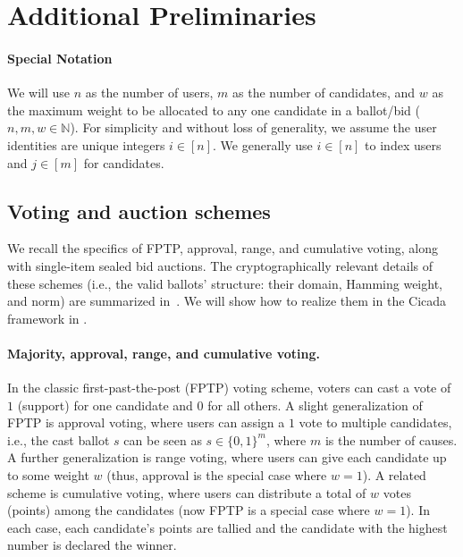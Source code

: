 \section{Additional Preliminaries}

\paragraph{Special Notation} We will use $n$ as the number of users, $m$ as the number of candidates, and $w$ as the maximum weight to be allocated to any one candidate in a ballot/bid ($n,m,w \in \mathbb{N}$). For simplicity and without loss of generality, we assume the user identities are unique integers $i \in [n]$.
We generally use $i \in [n]$ to index users and $j \in [m]$ for candidates.

\subsection{Voting and auction schemes}

We recall the specifics of FPTP, approval, range, and cumulative voting, along with single-item sealed bid auctions. The cryptographically relevant details of these schemes (i.e., the valid ballots' structure: their domain, Hamming weight, and norm) are summarized in~. We will show how to realize them in the Cicada framework in .



\paragraph{Majority, approval, range, and cumulative voting.} 
In the classic first-past-the-post (FPTP) voting scheme, voters can cast a vote of $1$ (support) for one candidate and $0$ for all others. A slight generalization of FPTP is approval voting, where users can assign a $1$ vote to multiple candidates, i.e., the cast ballot $s$ can be seen as $s\in\{0,1\}^{m}$, where $m$ is the number of causes. A further generalization is range voting, where users can give each candidate up to some weight $w$ (thus, approval is the special case where $w=1$). A related scheme is cumulative voting, where users can distribute a total of $w$ votes (points) among the candidates (now FPTP is a special case where $w=1$).
In each case, each candidate's points are tallied and the candidate with the highest number is declared the winner.


